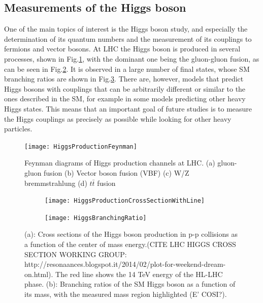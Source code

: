 \documentclass[a4paper,twoside,12pt]{article}
\begin{document}
\subsection{Measurements of the Higgs boson}
One of the main topics of interest is the Higgs boson study, and especially the determination of its quantum
numbers and the measurement of its couplings to fermions and vector bosons\cite{loi}. At LHC the Higgs
boson is produced in several processes, shown in Fig.\ref{fig:HiggsProductionFeynman}, with
the dominant one being the gluon-gluon fusion, as can be seen in Fig.\ref{fig:HiggsProductionCrossSection}. It is observed
in a large number of final states, whose SM branching ratios are shown in Fig.\ref{fig:HiggsBranchingRatio}. There are, however, models that
predict Higgs bosons with couplings that can be arbitrarily different or similar to the ones described in the
SM, for example in some models predicting other heavy Higgs states. This means that an important goal of future studies is
to measure the Higgs couplings as precisely as possible while looking for other heavy
particles. \\

\begin{figure} [h]
	\centering
	\texttt{[image: HiggsProductionFeynman]}
	\caption{Feynman diagrams of Higgs production channels at LHC\cite{HiggsFeynman}. (a) gluon-gluon fusion (b) Vector boson fusion (VBF) (c) W/Z bremmstrahlung (d) $t\bar{t}$ fusion}
	\label{fig:HiggsProductionFeynman}
\end{figure}


\begin{figure}
\centering
\begin{subfigure}{.5\textwidth}
  \centering
  \texttt{[image: HiggsProductionCrossSectionWithLine]}
  \caption{}
  \label{fig:HiggsProductionCrossSection}
\end{subfigure}%
\begin{subfigure}{.5\textwidth}
  \centering
  \texttt{[image: HiggsBranchingRatio]}
  \caption{}
  \label{fig:HiggsBranchingRatio}
\end{subfigure}
\caption{(a): Cross sections of the Higgs boson production in p-p collisions as a function of the center of mass energy.(CITE LHC HIGGS CROSS SECTION WORKING GROUP: http://resonaances.blogspot.it/2014/02/plot-for-weekend-dream-on.html). The red line
shows the 14 TeV energy of the HL-LHC phase. (b): Branching
ratios of the SM Higgs boson as a function of its mass, with the measured mass region highlighted (E' COSI?).}
\label{fig:test}
\end{figure}
\end{document}
